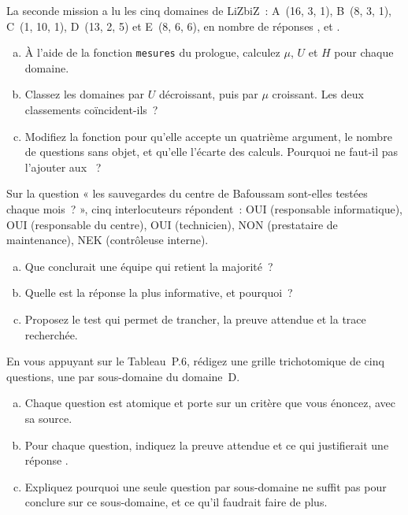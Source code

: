 \begin{boxexo}[title={\ding{45}\quad Exercice~P.7. Programmer les mesures \niveaumoyen}]
La seconde mission a lu les cinq domaines de LiZbiZ~: A~(16, 3, 1),
B~(8, 3, 1), C~(1, 10, 1), D~(13, 2, 5) et E~(8, 6, 6), en nombre de
réponses \OUI{}, \NON{} et \NEK{}.
\begin{enumerate}[(a)]
    \item À l'aide de la fonction \texttt{mesures} du prologue, calculez
          $\mu$, $U$ et $H$ pour chaque domaine.
    \item Classez les domaines par $U$ décroissant, puis par $\mu$
          croissant. Les deux classements coïncident-ils~?
    \item Modifiez la fonction pour qu'elle accepte un quatrième argument,
          le nombre de questions sans objet, et qu'elle l'écarte des
          calculs. Pourquoi ne faut-il pas l'ajouter aux \NEK{}~?
\end{enumerate}
\end{boxexo}

\begin{boxexo}[title={\ding{45}\quad Exercice~P.8. Voter ou chercher~? \niveaumoyen}]
Sur la question « les sauvegardes du centre de Bafoussam sont-elles
testées chaque mois~? », cinq interlocuteurs répondent~: OUI (responsable
informatique), OUI (responsable du centre), OUI (technicien), NON
(prestataire de maintenance), NEK (contrôleuse interne).
\begin{enumerate}[(a)]
    \item Que conclurait une équipe qui retient la majorité~?
    \item Quelle est la réponse la plus informative, et pourquoi~?
    \item Proposez le test qui permet de trancher, la preuve attendue et la
          trace recherchée.
\end{enumerate}
\end{boxexo}

\begin{boxexo}[title={\ding{45}\quad Exercice~P.9. Concevoir la grille du domaine D \niveauexpert}]
En vous appuyant sur le Tableau~P.6, rédigez une grille trichotomique de
cinq questions, une par sous-domaine du domaine~D.
\begin{enumerate}[(a)]
    \item Chaque question est atomique et porte sur un critère que vous
          énoncez, avec sa source.
    \item Pour chaque question, indiquez la preuve attendue et ce qui
          justifierait une réponse \NEK{}.
    \item Expliquez pourquoi une seule question par sous-domaine ne suffit
          pas pour conclure sur ce sous-domaine, et ce qu'il faudrait faire
          de plus.
\end{enumerate}
\end{boxexo}

